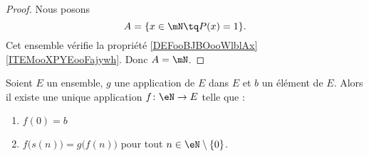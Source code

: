 \begin{proof}
	Nous posons
	\begin{equation}
		A=\{ x\in\mN\tq P(x)=1 \}.
	\end{equation}
	Cet ensemble vérifie la propriété \ref{DEFooBJBOooWlblAx}\ref{ITEMooXPYEooFajywh}. Donc \( A=\mN\).
\end{proof}

\begin{theorem}       \label{THOooEJPYooZFVnez}
	Soient \( E\) un ensemble, \( g\) une application de \( E\) dans \( E\) et \( b\) un élément de \( E\).  Alors il existe une unique application \( f\colon \eN\to E\) telle que :
	\begin{enumerate}
		\item
		      \( f(0)=b\)
		\item
		      \( f\big( s(n) \big)=g\big( f(n) \big)\) pour tout \( n\in \eN\setminus\{ 0 \}\).
	\end{enumerate}
\end{theorem}

